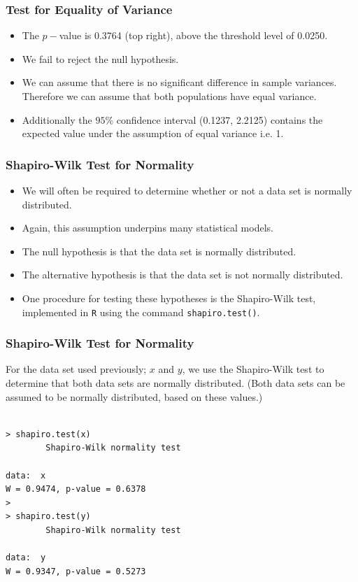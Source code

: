 \documentclass[a4]{beamer}
\begin{document}
\begin{frame}
\frametitle{Test for Equality of Variance}
\begin{itemize}
\item The $p-$value is 0.3764 (top right), above the threshold level of 0.0250.
\item We fail to reject the null hypothesis.
\item We can assume that there is no significant difference in sample variances. Therefore we can assume that both populations have equal variance.
\item Additionally the $95\%$ confidence interval (0.1237, 2.2125) contains the expected value under the assumption of equal variance i.e. 1.
\end{itemize}
\end{frame}




\begin{frame}
\frametitle{Shapiro-Wilk Test for Normality}


\begin{itemize}
\item We will often be required to determine whether or not a data set is normally distributed.
\item Again, this assumption underpins many statistical models.
\item The null hypothesis is that the data set is normally distributed.
\item The alternative hypothesis is that the data set is not normally distributed.
\item One procedure for testing these hypotheses is the Shapiro-Wilk test, implemented in \texttt{R} using the command \texttt{shapiro.test()}.
\end{itemize}
\end{frame}
\begin{frame}[fragile]
\frametitle{Shapiro-Wilk Test for Normality}
For the data set used previously; $x$ and $y$, we use the Shapiro-Wilk test to determine that both data sets are normally distributed.
(Both data sets can be assumed to be normally distributed, based on these values.)
\begin{verbatim}

> shapiro.test(x)
        Shapiro-Wilk normality test

data:  x
W = 0.9474, p-value = 0.6378
>
> shapiro.test(y)
        Shapiro-Wilk normality test

data:  y
W = 0.9347, p-value = 0.5273
\end{verbatim}

\end{frame}
\end{document}
